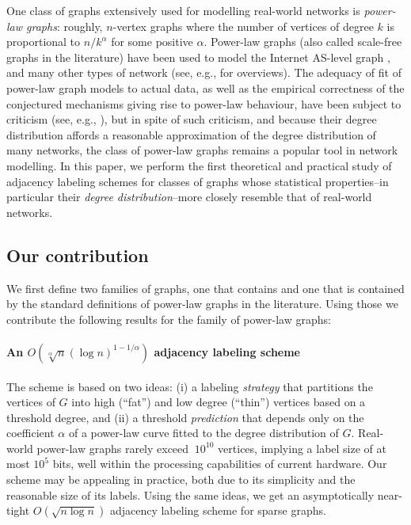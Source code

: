 One class of graphs extensively used for modelling real-world networks is \emph{power-law graphs}: roughly, $n$-vertex graphs where the number of vertices of degree $k$ is proportional to $n/k^{\alpha}$ for some positive $\alpha$. Power-law graphs (also called scale-free graphs in the literature) have been used to model the Internet AS-level graph \cite{DBLP:journals/ton/SiganosFFF03,DBLP:conf/podc/AkellaCKS03}, and many other types of network (see, e.g., \cite{mitzenmacher2004brief,clauset2009power} for overviews). 
The adequacy of fit of power-law graph models to actual data, as well as the empirical correctness of the conjectured mechanisms giving rise to power-law behaviour, have been subject to criticism (see, e.g., \cite{DBLP:journals/jacm/AchlioptasCKM09,clauset2009power}), but 
in spite of such criticism, and because their degree distribution affords a reasonable approximation of the degree distribution of many networks, the class of power-law graphs remains a popular tool in network modelling.
In this paper, we perform the first theoretical and practical study of adjacency labeling schemes for classes of graphs whose statistical properties--in particular their \emph{degree distribution}--more closely resemble that of real-world networks.


\subsection{Our contribution}
We first define two families of graphs, one that  contains and one that is contained by the standard definitions of power-law graphs in the literature.
Using those we contribute the following results for the family of power-law graphs:

\paragraph{An  $O(\sqrt[\alpha] n (\log n)^{1 - 1/\alpha})$ adjacency labeling scheme}
The scheme is based on two ideas:
(i) a labeling \emph{strategy} that  partitions the vertices of $G$ into high (``fat'') and low degree (``thin'') vertices based on a threshold degree, and (ii) a threshold \emph{prediction} that depends only on the coefficient $\alpha$ of a power-law curve fitted to the degree distribution of $G$. 
Real-world power-law graphs rarely exceed  $~10^{10}$ vertices, implying a label size of at most  ${10^{5}}$ bits, well within the processing capabilities of current hardware. 
Our  scheme may be appealing in practice,  both due  to its simplicity and the reasonable size of its labels.
Using the same ideas, we get an  asymptotically near-tight  $O(\sqrt{n \log n})$ adjacency labeling scheme for sparse graphs.

